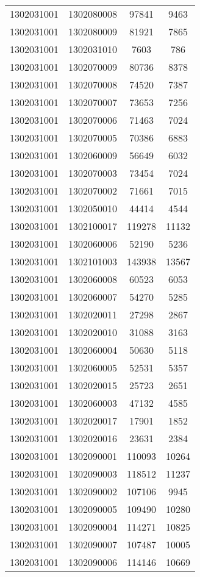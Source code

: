 \begin{longtable}{llcc}
1302031001 & 1302080008 & 97841 & 9463\\
1302031001 & 1302080009 & 81921 & 7865\\
1302031001 & 1302031010 & 7603 & 786\\
1302031001 & 1302070009 & 80736 & 8378\\
1302031001 & 1302070008 & 74520 & 7387\\
1302031001 & 1302070007 & 73653 & 7256\\
1302031001 & 1302070006 & 71463 & 7024\\
1302031001 & 1302070005 & 70386 & 6883\\
1302031001 & 1302060009 & 56649 & 6032\\
1302031001 & 1302070003 & 73454 & 7024\\
1302031001 & 1302070002 & 71661 & 7015\\
1302031001 & 1302050010 & 44414 & 4544\\
1302031001 & 1302100017 & 119278 & 11132\\
1302031001 & 1302060006 & 52190 & 5236\\
1302031001 & 1302101003 & 143938 & 13567\\
1302031001 & 1302060008 & 60523 & 6053\\
1302031001 & 1302060007 & 54270 & 5285\\
1302031001 & 1302020011 & 27298 & 2867\\
1302031001 & 1302020010 & 31088 & 3163\\
1302031001 & 1302060004 & 50630 & 5118\\
1302031001 & 1302060005 & 52531 & 5357\\
1302031001 & 1302020015 & 25723 & 2651\\
1302031001 & 1302060003 & 47132 & 4585\\
1302031001 & 1302020017 & 17901 & 1852\\
1302031001 & 1302020016 & 23631 & 2384\\
1302031001 & 1302090001 & 110093 & 10264\\
1302031001 & 1302090003 & 118512 & 11237\\
1302031001 & 1302090002 & 107106 & 9945\\
1302031001 & 1302090005 & 109490 & 10280\\
1302031001 & 1302090004 & 114271 & 10825\\
1302031001 & 1302090007 & 107487 & 10005\\
1302031001 & 1302090006 & 114146 & 10669\\

\end{longtable}
